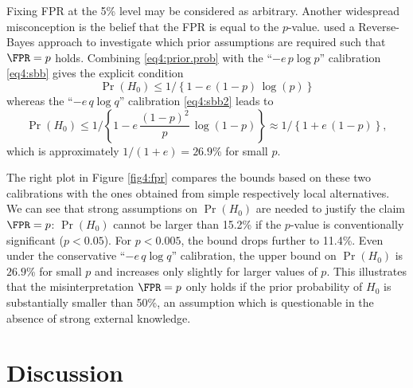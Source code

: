 Fixing FPR at the 5\% level may be considered as arbitrary. Another widespread
misconception is the belief that the FPR is equal to the $p$-value.
\citet{Held2013} used a Reverse-Bayes approach to investigate which prior
assumptions are required such that $\FPR=p$ holds. Combining
\eqref{eq4:prior.prob} with the ``$- e \, p \log p$'' calibration
\eqref{eq4:sbb} gives the explicit condition
\begin{equation*}
  \Pr(H_0) \leq 1/\left\{ 1 - e \, (1-p) \, \log(p) \right\}
\end{equation*}
whereas the ``$- e \, q \log q$'' calibration \eqref{eq4:sbb2} leads to
\begin{equation*}
  \Pr(H_0) \leq 1/\left\{ 1 - e \, \frac{(1-p)^2}{p} \, \log(1-p) \right\} \approx 1/\left\{ 1 + e \, (1-p) \right\},
\end{equation*}
which is approximately $1/(1+e)=26.9$\% for small $p$.

The right plot in Figure \ref{fig4:fpr} compares the bounds based on these two
calibrations with the ones obtained from simple respectively local alternatives.
We can see that strong assumptions on $\Pr(H_0)$ are needed to justify the claim
$\FPR=p$: $\Pr(H_0)$ cannot be larger than 15.2\% if the $p$-value is
conventionally significant ($p<0.05$). For $p<0.005$, the bound drops further to
11.4\%. Even under the conservative ``$- e \, q \log q$'' calibration, the upper
bound on $\Pr(H_0)$ is $26.9$\% for small $p$ and increases only slightly for
larger values of $p$. This illustrates that the misinterpretation $\FPR=p$ only
holds if the prior probability of $H_0$ is substantially smaller than 50\%, an
assumption which is questionable in the absence of strong external knowledge.

\section{Discussion}

